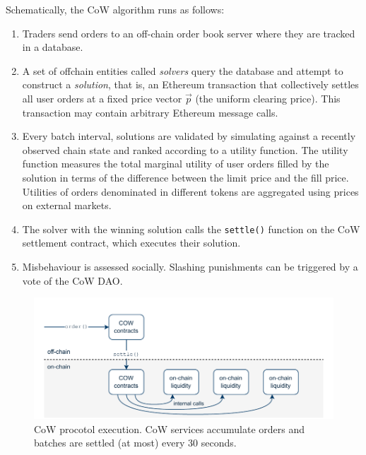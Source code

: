 \documentclass[a4paper,10pt]{article}
\theoremstyle{remark}
\begin{document}
Schematically, the CoW algorithm runs as follows:
\begin{enumerate}
  \item 
    Traders send orders to an off-chain order book server where they are tracked in a database.
    
  \item 
    A set of offchain entities called \emph{solvers} query the database and attempt to construct a \emph{solution}, that is, an Ethereum transaction that collectively settles all user orders at a fixed price vector $\vec{p}$ (the uniform clearing price).
    This transaction may contain arbitrary Ethereum message calls.
    
  \item
    Every batch interval, solutions are validated by simulating against a recently observed chain state and ranked according to a utility function.
    The utility function measures the total marginal utility of user orders filled by the solution in terms of the difference between the limit price and the fill price.
    Utilities of orders denominated in different tokens are aggregated using prices on external markets.
    
  \item
    The solver with the winning solution calls the \texttt{settle()} function on the CoW settlement contract, which executes their solution.
    
  \item
    Misbehaviour is assessed socially. Slashing punishments can be triggered by a vote of the CoW DAO.
\end{enumerate}
\begin{figure}
  \begin{center}
    \includegraphics[width=\textwidth * \real{0.8}]{diagrams/cow2.pdf}
    \caption{CoW procotol execution. CoW services accumulate orders and batches are settled (at most) every 30 seconds.}
  \end{center}
\end{figure}
\end{document}
